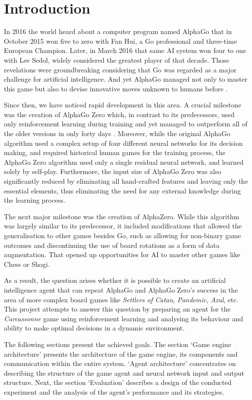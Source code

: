 \section{Introduction}
\label{chap:introduction}

In 2016 the world heard about a computer program named AlphaGo that in October 2015
won five to zero with Fan Hui, a Go professional and three-time European Champion. Later,
in March 2016 that same AI system won four to one with Lee Sedol, widely considered the
greatest player of that decade. Those revelations were groundbreaking considering that Go
was regarded as a major challenge for artificial intelligence. And yet AlphaGo managed not
only to master this game but also to devise innovative moves unknown to humans before \cite{AlphaGoBlog}.

Since then, we have noticed rapid development in this area. A crucial milestone was
the creation of AlphaGo Zero which, in contrast to its predecessors, used only reinforcement
learning during training and yet managed to outperform all of the older versions in only forty
days \cite{AlphaGoZeroBlog}. Moreover, while the original AlphaGo algorithm used a complex setup
of four different neural networks for its decision making, and required historical human games
for the training process, the AlphaGo Zero algorithm used only a single residual neural network,
and learned solely by self-play. Furthermore, the input size of AlphaGo Zero was also significantly
reduced by eliminating all hand-crafted features and leaving only the essential elements,
thus eliminating the need for any external knowledge during the learning process.

The next major milestone was the creation of AlphaZero. While this algorithm was largely similar
to its predecessor, it included modifications that allowed the generalisation to other games besides Go,
such as allowing for non-binary game outcomes and discontinuing the use of board rotations as a form of
data augmentation. That opened up opportunities for AI to master other games like Chess or Shogi.

As a result, the question arises whether it is possible to create an artificial intelligence
agent that can repeat AlphaGo and AlphaGo Zero's success in the area of more complex
board games like \textit{Settlers of Catan}, \textit{Pandemic}, \textit{Azul}, etc. This 
project attempts to answer this question by preparing an agent for the \textit{Carcassonne} game 
using reinforcement learning and analysing its behaviour and ability to make optimal 
decisions in a dynamic environment.

The following sections present the achieved goals. The section `Game engine architecture' 
presents the architecture of the game engine, its components and communication within the entire system. `Agent architecture' 
concentrates on describing the structure of the game agent and neural network input and
output structure. Next, the section `Evaluation' describes a design of the conducted experiment 
and the analysis of the agent's performance and its strategies.
